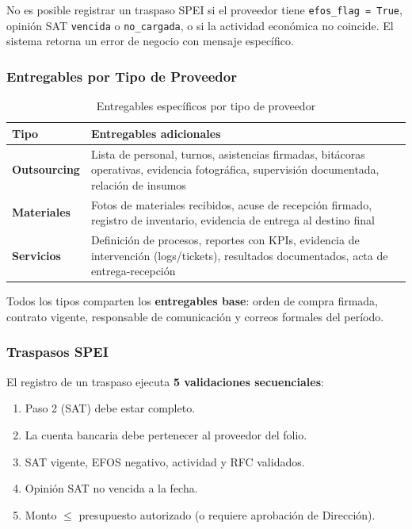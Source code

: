 \documentclass[12pt,a4paper]{article}
\begin{document}
\begin{rulebox}
No es posible registrar un traspaso SPEI si el proveedor tiene
\texttt{efos\_flag = True}, opini\'on SAT \texttt{vencida} o \texttt{no\_cargada},
o si la actividad econ\'omica no coincide. El sistema retorna un error de negocio
con mensaje espec\'ifico.
\end{rulebox}

\subsubsection{Entregables por Tipo de Proveedor}

\begin{table}[h!]
\centering
\begin{tabularx}{\textwidth}{>{\bfseries}lX}
\toprule
Tipo & Entregables adicionales \\
\midrule
Outsourcing & Lista de personal, turnos, asistencias firmadas, bit\'acoras
    operativas, evidencia fotogr\'afica, supervisi\'on documentada, relaci\'on de insumos \\[4pt]
Materiales & Fotos de materiales recibidos, acuse de recepci\'on firmado, registro de
    inventario, evidencia de entrega al destino final \\[4pt]
Servicios & Definici\'on de procesos, reportes con KPIs, evidencia de intervenci\'on
    (logs/tickets), resultados documentados, acta de entrega-recepci\'on \\
\bottomrule
\end{tabularx}
\caption{Entregables espec\'ificos por tipo de proveedor}
\end{table}

Todos los tipos comparten los \textbf{entregables base}: orden de compra firmada,
contrato vigente, responsable de comunicaci\'on y correos formales del per\'iodo.

\subsubsection{Traspasos SPEI}

El registro de un traspaso ejecuta \textbf{5 validaciones secuenciales}:

\begin{enumerate}
  \item Paso 2 (SAT) debe estar completo.
  \item La cuenta bancaria debe pertenecer al proveedor del folio.
  \item SAT vigente, EFOS negativo, actividad y RFC validados.
  \item Opini\'on SAT no vencida a la fecha.
  \item Monto $\leq$ presupuesto autorizado (o requiere aprobaci\'on de Direcci\'on).
\end{enumerate}
\end{document}
